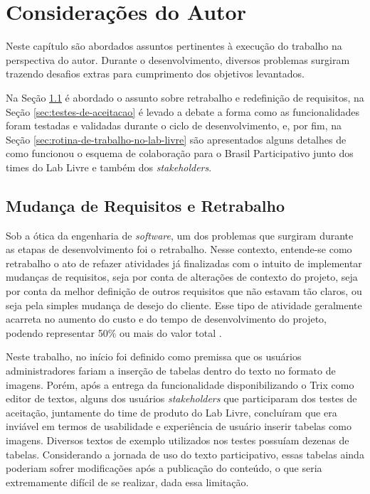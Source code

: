 \chapter {Considerações do Autor}

Neste capítulo são abordados assuntos pertinentes à execução do trabalho na perspectiva do autor.
Durante o desenvolvimento, diversos problemas surgiram trazendo desafios extras para cumprimento dos objetivos levantados.

Na Seção \ref{sec:mudanca-de-requisitos-e-retrabalho} é abordado o assunto sobre retrabalho e redefinição de requisitos, na Seção \ref{sec:testes-de-aceitacao} é levado a debate a forma como as funcionalidades foram testadas e validadas durante o ciclo de desenvolvimento, e, por fim, na Seção \ref{sec:rotina-de-trabalho-no-lab-livre} são apresentados alguns detalhes de como funcionou o esquema de colaboração para o Brasil Participativo junto dos times do Lab Livre e também dos \textit{stakeholders}.

\section {Mudança de Requisitos e Retrabalho}
\label{sec:mudanca-de-requisitos-e-retrabalho}

Sob a ótica da engenharia de \textit{software}, um dos problemas que surgiram durante as etapas de desenvolvimento foi o retrabalho.
Nesse contexto, entende-se como retrabalho o ato de refazer atividades já finalizadas com o intuito de implementar mudanças de requisitos, seja por conta de alterações de contexto do projeto, seja por conta da melhor definição de outros requisitos que não estavam tão claros, ou seja pela simples mudança de desejo do cliente.
Esse tipo de atividade geralmente acarreta no aumento do custo e do tempo de desenvolvimento do projeto, podendo representar 50\% ou mais do valor total \cite{jayatilleke2021-rework-in-software-development}.

Neste trabalho, no início foi definido como premissa que os usuários administradores fariam a inserção de tabelas dentro do texto no formato de imagens.
Porém, após a entrega da funcionalidade disponibilizando o Trix como editor de textos, alguns dos usuários \textit{stakeholders} que participaram dos testes de aceitação, juntamente do time de produto do Lab Livre, concluíram que era inviável em termos de usabilidade e experiência de usuário inserir tabelas como imagens.
Diversos textos de exemplo utilizados nos testes possuíam dezenas de tabelas.
Considerando a jornada de uso do texto participativo, essas tabelas ainda poderiam sofrer modificações após a publicação do conteúdo, o que seria extremamente difícil de se realizar, dada essa limitação.

